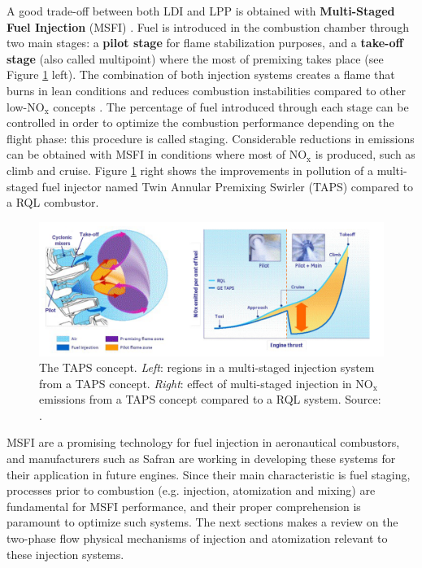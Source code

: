 A good trade-off between both LDI and LPP is obtained with \textbf{Multi-Staged Fuel Injection} (MSFI) . Fuel is introduced in the combustion chamber through two main stages: a \textbf{pilot stage} for flame stabilization purposes, and a \textbf{take-off stage} (also called multipoint) where the most of premixing takes place (see Figure \ref{fig:foust_TAPS} left). The combination of both injection systems creates a flame that burns in lean conditions and reduces combustion instabilities compared to other low-NO$_\mathrm{x}$ concepts . The percentage of fuel introduced through each stage can be controlled in order to optimize the combustion performance depending on the flight phase: this procedure is called staging. Considerable reductions in emissions can be obtained with MSFI in conditions where most of NO$_\mathrm{x}$ is produced, such as climb and cruise. Figure \ref{fig:foust_TAPS} right shows the improvements in pollution of a multi-staged fuel injector named Twin Annular Premixing Swirler (TAPS)  compared to a RQL combustor.

\begin{figure}[h!]
	\centering
	\includegraphics[scale=0.52]{./part0_intro/foust_TAPS}
	\caption[The TAPS concept]{The TAPS concept. \textsl{Left}: regions in a multi-staged injection system from a TAPS concept. \textsl{Right}: effect of multi-staged injection in NO$_\mathrm{x}$ emissions from a TAPS concept compared to a RQL system. Source: .}
	\label{fig:foust_TAPS}
\end{figure}

MSFI are a promising technology for fuel injection in aeronautical combustors, and manufacturers such as Safran are working in developing these systems for their application in future engines. Since their main characteristic is fuel staging, processes prior to combustion (e.g. injection, atomization and mixing) are fundamental for MSFI performance, and their proper comprehension is paramount to optimize such systems. The next sections makes a review on the two-phase flow physical mechanisms of injection and atomization relevant to these injection systems.


